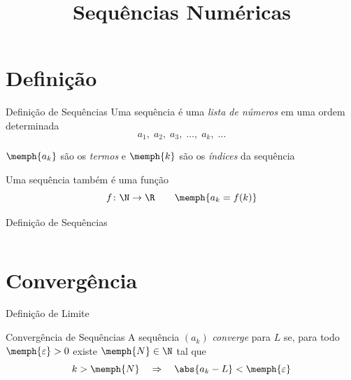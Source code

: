 \documentclass[fleqn,utf8,aspectratio=169,12pt]{beamer}
\title{Sequências Numéricas}
\begin{document}
\addtitle

\section{Definição}

\begin{frame}{Definição de Sequências}
    Uma sequência é uma \emph{lista de números} em uma ordem determinada
    \[a_1,\;a_2,\;a_3,\; \dots,\; a_k,\; \dots\]

    \pause
    $\memph{a_k}$ são os \emph{termos}
    \pause
    \;e\; $\memph{k}$ são os \emph{índices} da sequência

    \pause
    \vspace{\baselineskip}
    Uma sequência também é uma função
    \[f\colon\N\to\R \qquad \memph{a_k = f(k)}\]
\end{frame}

\begin{frame}{Definição de Sequências}
\begin{columns}
  \centerline{\scalebox{0.9}{}}  \pause
  \centerline{\scalebox{0.9}{}}
\end{columns}
\end{frame}




\section{Convergência}

\begin{frame}{Definição de Limite}
  \centering
  \scalebox{0.9}{}
\end{frame}

\begin{frame}{Convergência de Sequências}
  A sequência $(a_k)$ \emph{converge} para $L$ se, para todo $\memph{\varepsilon}>0$
  existe $\memph{N}\in \N$ tal que
  \[
   	k>\memph{N} \quad \Rightarrow  \quad \abs{a_k-L}<\memph{\varepsilon}
  \]
\end{frame}
\end{document}
